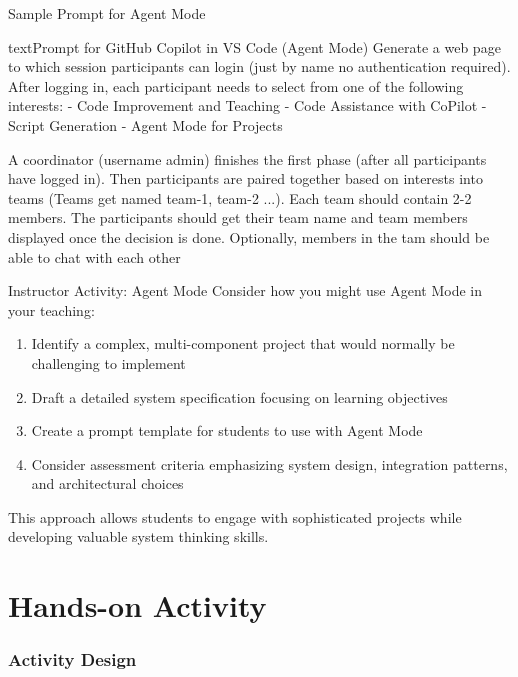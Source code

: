 \documentclass[xcolor=dvipsnames, aspectratio=169]{beamer}
\begin{document}
\begin{frame}[fragile]{Sample Prompt for Agent Mode}
  \begin{codeboxtc}{text}{Prompt for GitHub Copilot in VS Code (Agent Mode)}{}{}
Generate a web page to which session participants can login (just by name no authentication required). After logging in, each participant needs to select from one of the following interests:
- Code Improvement and Teaching
- Code Assistance with CoPilot
- Script Generation
- Agent Mode for Projects

A coordinator (username admin) finishes the first phase (after all participants have logged in). Then participants are paired together based on interests into teams (Teams get named team-1, team-2 ...). Each team should contain 2-2 members. The participants should get their team name and team members displayed once the decision is done. Optionally, members in the tam should be able to chat with each other
  \end{codeboxtc}
\end{frame}

\begin{frame}{Instructor Activity: Agent Mode}
  Consider how you might use Agent Mode in your teaching:
  
  \begin{enumerate}
    \item Identify a complex, multi-component project that would normally be challenging to implement
    \item Draft a detailed system specification focusing on learning objectives
    \item Create a prompt template for students to use with Agent Mode
    \item Consider assessment criteria emphasizing system design, integration patterns, and architectural choices
  \end{enumerate}
  
  This approach allows students to engage with sophisticated projects while developing valuable system thinking skills.
\end{frame}

\part[Hands-on Activity]{Hands-on Activity}
\section{Activity Design}
\end{document}
